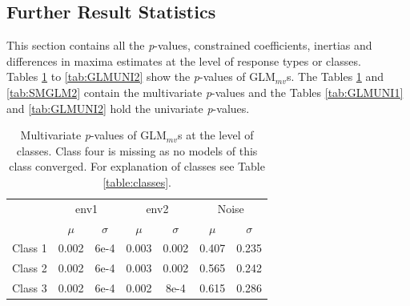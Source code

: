 		\newpage
		
	\subsection{Further Result Statistics}	
	
		This section contains all the \textit{p}-values, constrained coefficients, inertias and differences in maxima estimates at the level of response types or classes.\\
		Tables \ref{tab:SMGLM1} to \ref{tab:GLMUNI2} show the \textit{p}-values of GLM$_{mv}$s. 
		The Tables \ref{tab:SMGLM1} and \ref{tab:SMGLM2} contain the multivariate \textit{p}-values and the Tables \ref{tab:GLMUNI1} and \ref{tab:GLMUNI2} hold the univariate \textit{p}-values.
	
		\begin{table}[h!] 
			\small
			\caption{Multivariate \textit{p}-values of GLM$_{mv}$s at the level of classes. Class four is missing as no models of this class converged. For explanation of classes see Table \ref{table:classes}.}
			\centering
			\begin{tabular}{@{}lcccccc@{}}
				
				\toprule
				& \multicolumn{2}{c}{env1} & \multicolumn{2}{c}{env2} & \multicolumn{2}{c}{Noise}\\ \cmidrule(l){2-3} \cmidrule(l){4-5} \cmidrule(l){6-7}
				& $\mu$ & $\sigma$ & $\mu$ & $\sigma$ & $\mu$ & $\sigma$\\
				\hline
				Class 1 & 0.002 & 6e-4 & 0.003 & 0.002 & 0.407 & 0.235\\
				Class 2 & 0.002 & 6e-4 & 0.003 & 0.002 & 0.565 & 0.242\\
				Class 3 & 0.002 & 6e-4 & 0.002 & 8e-4  & 0.615 & 0.286\\
				\toprule
			\end{tabular}
			
			\label{tab:SMGLM1}
			
		\end{table}
		

